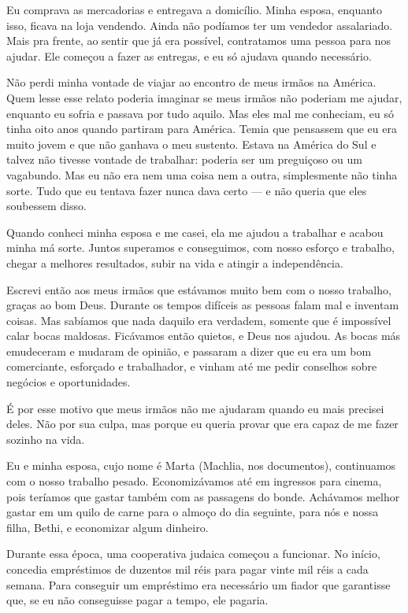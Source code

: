 Eu comprava as mercadorias e entregava a domicílio. Minha esposa,
enquanto isso, ficava na loja vendendo. Ainda não podíamos ter um
vendedor assalariado. Mais pra frente, ao sentir que já era possível, 
contratamos uma pessoa para nos ajudar. Ele começou a fazer
as entregas, e eu só ajudava quando necessário.

Não perdi minha vontade de viajar ao encontro de meus irmãos
na América. Quem lesse esse relato poderia imaginar se meus irmãos não
poderiam me ajudar, enquanto eu sofria e passava por tudo aquilo. 
Mas eles mal me conheciam, eu só tinha oito anos quando partiram para América. 
Temia que pensassem que eu era muito jovem e que não ganhava o meu sustento. 
Estava na América do Sul e talvez não tivesse vontade de
trabalhar: poderia ser um preguiçoso ou um vagabundo. Mas eu não era nem uma coisa
nem a outra, simplesmente não tinha sorte. Tudo que eu tentava fazer
nunca dava certo --- e não queria que eles soubessem disso.

Quando conheci minha esposa e me casei, ela me ajudou a trabalhar e
acabou minha má sorte. Juntos superamos e conseguimos, com nosso
esforço e trabalho, chegar a melhores resultados, subir
na vida e atingir a independência.

Escrevi então aos meus irmãos que estávamos muito bem com o nosso
trabalho, graças ao bom Deus. Durante os tempos difíceis as
pessoas falam mal e inventam coisas. Mas sabíamos que
nada daquilo era verdadem, somente que é impossível calar bocas maldosas.
Ficávamos então quietos, e Deus nos ajudou. As bocas más emudeceram e mudaram
de opinião, e passaram a dizer que eu era um bom comerciante, esforçado e trabalhador,
e vinham até me pedir conselhos sobre negócios e oportunidades.

É por esse motivo que meus irmãos não me ajudaram quando
eu mais precisei deles. Não por sua culpa, mas porque eu queria
provar que era capaz de me fazer sozinho na vida.

Eu e minha esposa, cujo nome é Marta (Machlia, nos documentos), continuamos
com o nosso trabalho pesado. Economizávamos até em ingressos para cinema,
pois teríamos que gastar também com as passagens do bonde.
Achávamos melhor gastar em um quilo de carne para o almoço do dia
seguinte, para nós e nossa filha, Bethi, e economizar algum dinheiro.

Durante essa época, uma cooperativa judaica começou a funcionar. No início, 
concedia empréstimos de duzentos mil réis para pagar vinte mil réis a
cada semana. Para conseguir um empréstimo era necessário um fiador que garantisse que, 
se eu não conseguisse pagar a tempo, ele pagaria.

